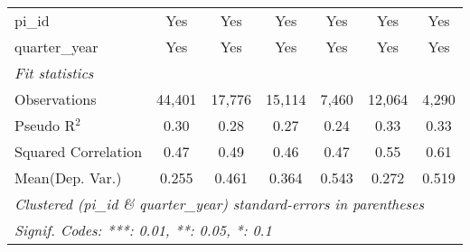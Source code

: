 \begin{tabular}{lcccccc}
   pi\_id                                                     & Yes           & Yes           & Yes           & Yes            & Yes           & Yes\\  
   quarter\_year                                              & Yes           & Yes           & Yes           & Yes            & Yes           & Yes\\  
   \midrule
   \emph{Fit statistics}\\
   Observations                                               & 44,401        & 17,776        & 15,114        & 7,460          & 12,064        & 4,290\\  
   Pseudo R$^2$                                               & 0.30          & 0.28          & 0.27          & 0.24           & 0.33          & 0.33\\  
   Squared Correlation                                        & 0.47          & 0.49          & 0.46          & 0.47           & 0.55          & 0.61\\  
Mean(Dep. Var.) & 0.255 & 0.461 & 0.364 & 0.543 & 0.272 & 0.519 \\
   \midrule \midrule
   \multicolumn{7}{l}{\emph{Clustered (pi\_id \& quarter\_year) standard-errors in parentheses}}\\
   \multicolumn{7}{l}{\emph{Signif. Codes: ***: 0.01, **: 0.05, *: 0.1}}\\
\end{tabular}
\par\endgroup
